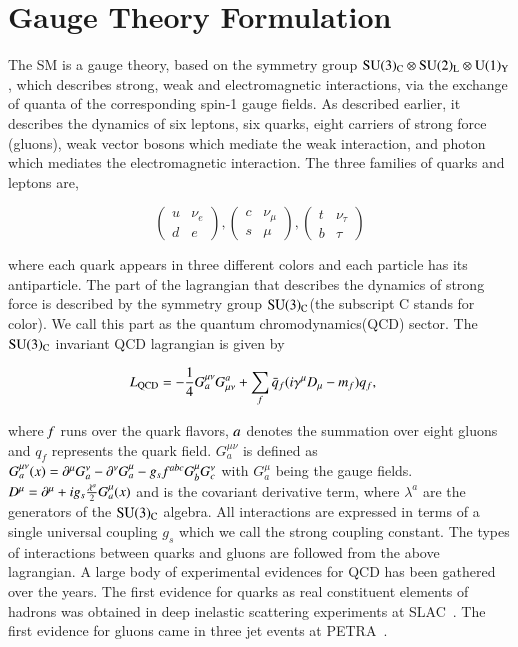 	
\section{Gauge Theory Formulation}


The SM is a gauge theory, based on the symmetry group $\rm SU(3)_{C} \otimes SU(2)_{L} \otimes U(1)_{Y}$, which describes strong, weak and electromagnetic interactions,  via the exchange of quanta of the corresponding spin-1 gauge fields. As described earlier, it describes the dynamics of six leptons, six quarks, eight carriers of strong force (gluons), weak vector bosons which mediate the weak interaction, and photon which mediates the electromagnetic interaction. The three families of quarks and leptons are,


$$\left( \begin{array}{cc} u & \nu_{e} \\ d & e  \end{array} \right), \left( \begin{array}{cc} c & \nu_{\mu}  \\ s & \mu  \end{array} \right),\left( \begin{array}{cc} t & \nu_{\tau} \\ b & \tau  \end{array} \right)$$

where each quark appears in three different colors and each particle has its antiparticle. The part of the lagrangian that describes the dynamics of strong force is described by the symmetry group $\rm SU(3)_{C}$(the subscript C stands for color). We call this part as the quantum chromodynamics(QCD) sector. The $\rm SU(3)_{C}$ invariant QCD lagrangian is given by 

\begin{align} \label{LQCD}
\it L_{\rm QCD} &= - \frac{1}{4} G^{\mu\nu}_{a}G^{a}_{\mu\nu} + \sum_{f} \bar{q}_{f} (i\gamma^{\mu}D_{\mu}- m_{f})q_{f},  
\end{align}

where $\it f$ runs over the quark flavors, $\it a$ denotes the summation over eight gluons and $q_{f}$ represents the quark field.  $G^{\mu\nu}_{a}$ is defined as $G^{\mu\nu}_{a}(x) = \partial^{\mu}G^{\nu}_{a} - \partial^{\nu}G^{\mu}_{a} - g_{s}f^{abc}G^{\mu}_{b}G^{\nu}_{c} $ with $G^{\mu}_{a}$ being the gauge fields. $D^{\mu} = \partial^{\mu} + ig_{s}\frac{\lambda^{a}}{2}G^{\mu}_{a}(x)$ and  is  the covariant derivative term, where  $\lambda^{a}$ are the generators of the $\rm SU(3)_{C}$
algebra. All interactions are expressed in terms of a single universal coupling $g_{s}$ which we call the strong coupling constant. The types of interactions between quarks and gluons are followed from the above lagrangian. A large body of experimental evidences for QCD has been gathered over the years. The first evidence for quarks as real constituent elements of hadrons was obtained in deep inelastic scattering experiments at SLAC~\cite{Quark1,Quark2}. The first evidence for gluons came in three jet events at PETRA~\cite{Gluon}.

